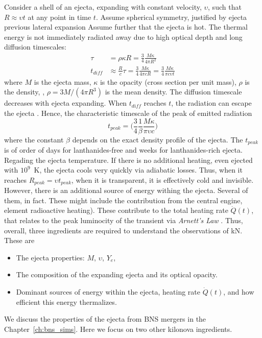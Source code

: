 Consider a shell of an ejecta, expanding with constant velocity, $\upsilon$, such that 
$R\approx\upsilon t$ at any point in time $t$. Assume spherical symmetry, justified by 
ejecta previous lateral expansion \citep{Roberts:2011,Grossman:2013lqa,Rosswog:2013kqa}
%
Assume further that the ejecta is hot.
The thermal energy is not immediately radiated away due to high optical depth and long diffusion timescales:
%
\begin{align}
\tau &= \rho \kappa R = \frac{3}{4}\frac{M\kappa}{4\pi R^2}\\ 
t_{diff} &\approx \frac{R}{c}\tau = \frac{3}{4}\frac{M\kappa}{4\pi c R} = \frac{3}{4}\frac{M\kappa}{\pi c \upsilon t}
\end{align}
%
where $M$ is the ejecta mass, $\kappa$ is the opacity (cross section per unit mass), 
$\rho$ is the density, \eg, $\rho=3M/(4\pi R^3)$ is the mean density.
%
The diffusion timescale decreases with ejecta expanding. 
When $t_{diff}$ reaches $t$, the radiation can escape the ejecta \citep{Arnett:1982}. 
Hence, the characteristic timescale of the peak of emitted radiation 
%
\begin{equation}
    t_{peak} = \Big(\frac{3}{4}\frac{1}{\beta}\frac{M\kappa}{\pi \upsilon c}\Big)
\end{equation}
%
where the constant $\beta$ depends on the exact density profile of the ejecta. 
The $t_{peak}$ is of order of days for lanthanides-free and weeks for lanthanides-rich ejecta.
%
Regading the ejecta temperature. If there is no additional heating, even ejected with $10^9$~K, 
the ejecta cools very quickly via adiabatic losses. Thus, when it reaches 
$R_{peak} = \upsilon t_{peak}$, when it is transparent, it is effectively cold and invisible. 
%
However, there is an additional source of energy withing the ejecta. Several of them, in fact. 
These might include the contribution from the central engine, \rproc{} element radioactive heating). 
These contribute to the total heating rate $\dot{Q}(t)$, that relates to the peak luminocity 
of the transient via \textit{Arnett's Law} \citep{Arnett:1982}.
%
Thus, overall, three ingredients are required to understand the observations of \ac{kN}. These are 
\begin{itemize}
    \item The ejecta properties: $M$, $\upsilon$, $Y_e$,
    \item The composition of the expanding ejecta and its optical opacity.
    \item Dominant sources of energy within the ejecta, heating rate $\dot{Q}(t)$, and how 
    efficient this energy thermalizes.
\end{itemize}
%
We discuss the properties of the ejecta from \ac{BNS} mergers in the Chapter~\ref{ch:bns_sims}.
%
Here we focus on two other kilonova ingredients.



